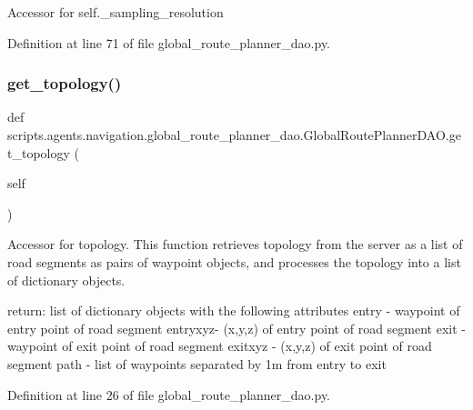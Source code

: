 \begin{DoxyVerb}Accessor for self._sampling_resolution \end{DoxyVerb}
 

Definition at line 71 of file global\+\_\+route\+\_\+planner\+\_\+dao.\+py.

\mbox{\label{classscripts_1_1agents_1_1navigation_1_1global__route__planner__dao_1_1GlobalRoutePlannerDAO_adc57ea46ad2f68901f15e8fb11d097e5}} 
\subsubsection{\texorpdfstring{get\+\_\+topology()}{get\_topology()}}
{\footnotesize\ttfamily def scripts.\+agents.\+navigation.\+global\+\_\+route\+\_\+planner\+\_\+dao.\+Global\+Route\+Planner\+D\+A\+O.\+get\+\_\+topology (\begin{DoxyParamCaption}\item[{}]{self }\end{DoxyParamCaption})}

\begin{DoxyVerb}Accessor for topology.
This function retrieves topology from the server as a list of
road segments as pairs of waypoint objects, and processes the
topology into a list of dictionary objects.

return: list of dictionary objects with the following attributes
entry   -   waypoint of entry point of road segment
entryxyz-   (x,y,z) of entry point of road segment
exit    -   waypoint of exit point of road segment
exitxyz -   (x,y,z) of exit point of road segment
path    -   list of waypoints separated by 1m from entry
            to exit
\end{DoxyVerb}
 

Definition at line 26 of file global\+\_\+route\+\_\+planner\+\_\+dao.\+py.


